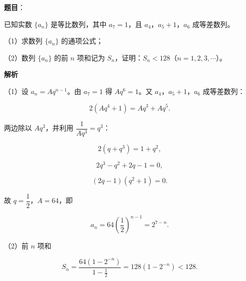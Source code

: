 \begin{answer}

\textbf{题目}：

已知实数 $\{a_n\}$ 是等比数列，其中 $a_7=1$，且 $a_4$，$a_5+1$，$a_6$ 成等差数列。

（1）求数列 $\{a_n\}$ 的通项公式；

（2）数列 $\{a_n\}$ 的前 $n$ 项和记为 $S_n$，证明：$S_n<128$（$n=1,2,3,\cdots$）。

\textbf{解析}

（1）设 $a_n=Aq^{n-1}$。由 $a_7=1$ 得 $Aq^6=1$。又 $a_4$，$a_5+1$，$a_6$ 成等差数列：

\nopagebreak[4]
\[2(Aq^4+1)=Aq^3+Aq^5.\]

两边除以 $Aq^3$，并利用 $\dfrac1{Aq^3}=q^3$：

\nopagebreak[4]
\[2(q+q^3)=1+q^2,\]

\nopagebreak[4]
\[2q^3-q^2+2q-1=0,\]

\nopagebreak[4]
\[(2q-1)(q^2+1)=0.\]

故 $q=\dfrac12$，$A=64$，即

\nopagebreak[4]
\[a_n=64\left(\frac12\right)^{n-1}=2^{7-n}.\]

（2）前 $n$ 项和

\nopagebreak[4]
\[S_n=\frac{64\left(1-2^{-n}\right)}{1-\frac12}=128(1-2^{-n})<128.\]


\end{answer}
